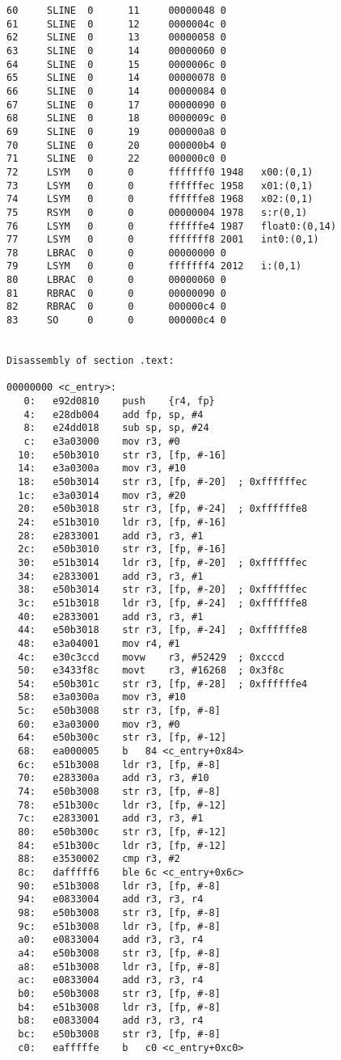 \begin{lstlisting}
60     SLINE  0      11     00000048 0      
61     SLINE  0      12     0000004c 0      
62     SLINE  0      13     00000058 0      
63     SLINE  0      14     00000060 0      
64     SLINE  0      15     0000006c 0      
65     SLINE  0      14     00000078 0      
66     SLINE  0      14     00000084 0      
67     SLINE  0      17     00000090 0      
68     SLINE  0      18     0000009c 0      
69     SLINE  0      19     000000a8 0      
70     SLINE  0      20     000000b4 0      
71     SLINE  0      22     000000c0 0      
72     LSYM   0      0      fffffff0 1948   x00:(0,1)
73     LSYM   0      0      ffffffec 1958   x01:(0,1)
74     LSYM   0      0      ffffffe8 1968   x02:(0,1)
75     RSYM   0      0      00000004 1978   s:r(0,1)
76     LSYM   0      0      ffffffe4 1987   float0:(0,14)
77     LSYM   0      0      fffffff8 2001   int0:(0,1)
78     LBRAC  0      0      00000000 0      
79     LSYM   0      0      fffffff4 2012   i:(0,1)
80     LBRAC  0      0      00000060 0      
81     RBRAC  0      0      00000090 0      
82     RBRAC  0      0      000000c4 0      
83     SO     0      0      000000c4 0      


Disassembly of section .text:

00000000 <c_entry>:
   0:	e92d0810 	push	{r4, fp}
   4:	e28db004 	add	fp, sp, #4
   8:	e24dd018 	sub	sp, sp, #24
   c:	e3a03000 	mov	r3, #0
  10:	e50b3010 	str	r3, [fp, #-16]
  14:	e3a0300a 	mov	r3, #10
  18:	e50b3014 	str	r3, [fp, #-20]	; 0xffffffec
  1c:	e3a03014 	mov	r3, #20
  20:	e50b3018 	str	r3, [fp, #-24]	; 0xffffffe8
  24:	e51b3010 	ldr	r3, [fp, #-16]
  28:	e2833001 	add	r3, r3, #1
  2c:	e50b3010 	str	r3, [fp, #-16]
  30:	e51b3014 	ldr	r3, [fp, #-20]	; 0xffffffec
  34:	e2833001 	add	r3, r3, #1
  38:	e50b3014 	str	r3, [fp, #-20]	; 0xffffffec
  3c:	e51b3018 	ldr	r3, [fp, #-24]	; 0xffffffe8
  40:	e2833001 	add	r3, r3, #1
  44:	e50b3018 	str	r3, [fp, #-24]	; 0xffffffe8
  48:	e3a04001 	mov	r4, #1
  4c:	e30c3ccd 	movw	r3, #52429	; 0xcccd
  50:	e3433f8c 	movt	r3, #16268	; 0x3f8c
  54:	e50b301c 	str	r3, [fp, #-28]	; 0xffffffe4
  58:	e3a0300a 	mov	r3, #10
  5c:	e50b3008 	str	r3, [fp, #-8]
  60:	e3a03000 	mov	r3, #0
  64:	e50b300c 	str	r3, [fp, #-12]
  68:	ea000005 	b	84 <c_entry+0x84>
  6c:	e51b3008 	ldr	r3, [fp, #-8]
  70:	e283300a 	add	r3, r3, #10
  74:	e50b3008 	str	r3, [fp, #-8]
  78:	e51b300c 	ldr	r3, [fp, #-12]
  7c:	e2833001 	add	r3, r3, #1
  80:	e50b300c 	str	r3, [fp, #-12]
  84:	e51b300c 	ldr	r3, [fp, #-12]
  88:	e3530002 	cmp	r3, #2
  8c:	dafffff6 	ble	6c <c_entry+0x6c>
  90:	e51b3008 	ldr	r3, [fp, #-8]
  94:	e0833004 	add	r3, r3, r4
  98:	e50b3008 	str	r3, [fp, #-8]
  9c:	e51b3008 	ldr	r3, [fp, #-8]
  a0:	e0833004 	add	r3, r3, r4
  a4:	e50b3008 	str	r3, [fp, #-8]
  a8:	e51b3008 	ldr	r3, [fp, #-8]
  ac:	e0833004 	add	r3, r3, r4
  b0:	e50b3008 	str	r3, [fp, #-8]
  b4:	e51b3008 	ldr	r3, [fp, #-8]
  b8:	e0833004 	add	r3, r3, r4
  bc:	e50b3008 	str	r3, [fp, #-8]
  c0:	eafffffe 	b	c0 <c_entry+0xc0>
\end{lstlisting}





